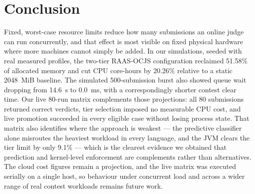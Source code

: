 \documentclass[conference]{IEEEtran}
\begin{document}
\section{Conclusion}
Fixed, worst-case resource limits reduce how many submissions an online judge can run concurrently, and that effect is most visible on fixed physical hardware where more machines cannot simply be added. In our simulations, seeded with real measured profiles, the two-tier RAAS-OCJS configuration reclaimed 51.58\% of allocated memory and cut CPU core-hours by 20.26\% relative to a static 2048~MiB baseline. The simulated 500-submission burst also showed queue wait dropping from 14.6~s to 0.0~ms, with a correspondingly shorter contest clear time. Our live 80-run matrix complements those projections: all 80 submissions returned correct verdicts, tier selection imposed no measurable CPU cost, and live promotion succeeded in every eligible case without losing process state. That matrix also identifies where the approach is weakest --- the predictive classifier alone misroutes the heaviest workload in every language, and the JVM clears the tier limit by only 9.1\% --- which is the clearest evidence we obtained that prediction and kernel-level enforcement are complements rather than alternatives. The cloud cost figures remain a projection, and the live matrix was executed serially on a single host, so behaviour under concurrent load and across a wider range of real contest workloads remains future work.
\end{document}
